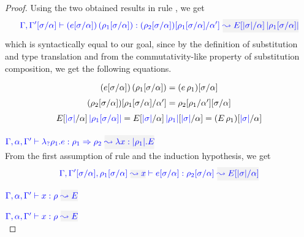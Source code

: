 \begin{proof}
Using the two obtained results in rule , we get
\begin{equation*}
\wte{\tenv,\tenv'[\suty/\alpha]}{\mmapp{(e[\suty/\alpha])}{(\rulet_1[\suty/\alpha])}}{(\rulet_2[\suty/\alpha])[\rulet_1[\suty/\alpha] /\alpha']}{\mmapp{E[\etrans{\suty}/\alpha]}{\etrans{\rulet_1[\suty/\alpha]}}}
\end{equation*}
which is syntactically equal to our goal, since by the definition of substitution and type
translation and from the commutativity-like property of substitution composition, we get the following equations.
\begin{equation*}
\arraycolsep=1.4pt\def\arraystretch{1.5}
\begin{array}{c}
\mmapp{(e[\suty/\alpha])}{(\rulet_1[\suty/\alpha])} = (\mmapp{e}{\rulet_1})[\suty/\alpha]\\
(\rulet_2[\suty/\alpha])[\rulet_1[\suty/\alpha] /\alpha'] = \rulet_2[\rulet_1/\alpha'][\suty/\alpha]\\
\mmapp{E[\etrans{\suty}/\alpha]}{\etrans{\rulet_1[\suty/\alpha]}} = \mmapp{E[\etrans{\suty}/\alpha]}{\etrans{\rulet_1}[\etrans{\suty}/\alpha]} = (\mmapp{E}{\rulet_1})[\etrans{\suty}/\alpha]
\end{array}
\end{equation*}

\item[\fbox{\rref{Ty-IAbs}}]\quad$\wte{\tenv,\alpha,\tenv'}{\ilambda \rulet_1.e}{\rulet_1 \iarrow \rulet_2}{\abs{x}{\etrans{\rulet_1}}{E}}$\\
From the first assumption of rule  and the induction hypothesis, we get
\begin{equation*}
\wte{\tenv,\tenv'[\suty/\alpha],\ie{\rulet_1[\suty/\alpha]}{x}}{e[\suty/\alpha]}{\rulet_2[\suty/\alpha]}{E[\etrans{\suty}/\alpha]}
\end{equation*}

\item[\fbox{\rref{Ty-Var}}]\quad$\wte{\tenv,\alpha,\tenv'}{x}{\rulet}{E}$\\

\item[\fbox{\rref{Ty-Var}}]\quad$\wte{\tenv,\alpha,\tenv'}{x}{\rulet}{E}$\\
\end{proof}


